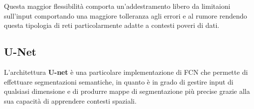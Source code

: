 Questa maggior flessibilità comporta un'addestramento libero da limitaioni sull'input comportando una maggiore tolleranza agli errori e al rumore rendendo questa tipologia di reti particolarmente adatte a contesti poveri di dati.


\subsection{U-Net}

L'architettura \textbf{U-net} \cite{ronneberger2015unet} è una particolare implementazione di FCN che permette di effettuare segmentazioni semantiche, in quanto è in grado di gestire input di qualsiasi dimensione e di produrre mappe di segmentazione pi\`u precise grazie alla sua capacit\`a di apprendere contesti spaziali.





%
%
%
%
%
